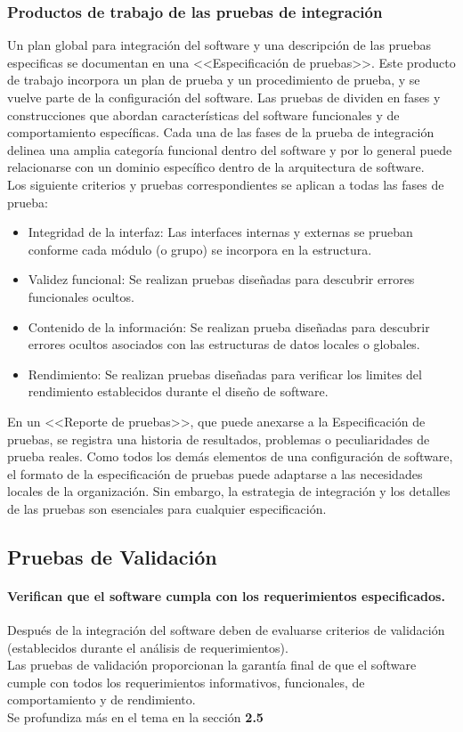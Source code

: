 \subsubsection{Productos de trabajo de las pruebas de integración}
Un plan global para integración del software y una descripción de las pruebas especificas se documentan en una <<Especificación de pruebas>>. Este producto de trabajo incorpora un plan de prueba y un procedimiento de prueba, y se vuelve parte de la configuración del software. Las pruebas de dividen en fases y construcciones que abordan características del software funcionales y de comportamiento específicas. Cada una de las fases de la prueba de integración delinea una amplia categoría funcional dentro del software y por lo general puede relacionarse con un dominio específico dentro de la arquitectura de software.\\ Los siguiente criterios y pruebas correspondientes se aplican a todas las fases de prueba:
\begin{itemize}
	\item Integridad de la interfaz: Las interfaces internas y externas se prueban conforme cada módulo (o grupo) se incorpora en la estructura.
	\item Validez funcional: Se realizan pruebas diseñadas para descubrir errores funcionales ocultos.
	\item Contenido de la información: Se realizan prueba diseñadas para descubrir errores ocultos asociados con las estructuras de datos locales o globales.
	\item Rendimiento: Se realizan pruebas diseñadas para verificar los limites del rendimiento establecidos durante el diseño de software.
\end{itemize}
En un <<Reporte de pruebas>>, que puede anexarse a la Especificación de pruebas, se registra una historia de resultados, problemas o peculiaridades de prueba reales. Como todos los demás elementos de una configuración de software, el formato de la especificación de pruebas puede adaptarse a las necesidades locales de la organización. Sin embargo, la estrategia de integración y los detalles de las pruebas son esenciales para cualquier especificación.
\subsection{Pruebas de Validación}
\paragraph{Verifican que el software cumpla con los requerimientos especificados.}
Después de la integración del software deben de evaluarse criterios de validación (establecidos durante el análisis de requerimientos).\\ Las pruebas de validación proporcionan la garantía final de que el software cumple con todos los requerimientos informativos, funcionales, de comportamiento y de rendimiento.\\ Se profundiza más en el tema en la sección \textbf{2.5}
